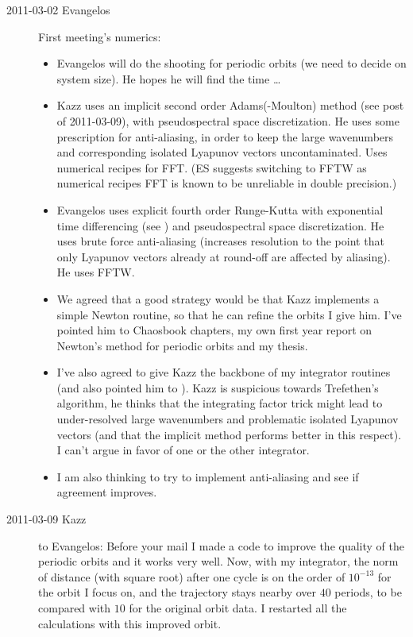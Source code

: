 \begin{description}
\item[2011-03-02 Evangelos] First meeting's numerics:
  \begin{itemize}
  \item Evangelos will do the shooting for periodic orbits
    (we need to decide on system size). He hopes he will find the time \ldots
  \item Kazz uses an implicit second order Adams(-Moulton) method (see post of
    2011-03-09), with pseudospectral space discretization.
    He uses some prescription for anti-aliasing, in order to keep the large wavenumbers
    and corresponding isolated Lyapunov vectors uncontaminated. Uses numerical
    recipes for FFT. (ES suggests switching to FFTW as numerical recipes FFT is
    known to be unreliable in double precision.)
  \item Evangelos uses explicit fourth order Runge-Kutta with exponential
    time differencing (see ) and pseudospectral space
    discretization. He uses brute force anti-aliasing (increases resolution
    to the point that only Lyapunov vectors already at round-off are affected by
    aliasing). He uses FFTW.
  \item We agreed that a good strategy would be that Kazz implements a simple
    Newton routine, so that he can refine the orbits I give him. I've
    pointed him to Chaosbook chapters, my own first year report on Newton's
    method for periodic orbits and my thesis.
  \item I've also agreed to give Kazz the backbone of my integrator routines
    (and also pointed him to ). Kazz is suspicious towards
    Trefethen's algorithm, he thinks that the integrating factor trick might
    lead to under-resolved large wavenumbers and problematic isolated
    Lyapunov vectors (and that the implicit method performs better in this
    respect). I can't argue in favor of one or the other integrator.
  \item I am also thinking to try to implement anti-aliasing and see
    if agreement improves.
  \end{itemize}

\item[2011-03-09 Kazz] to Evangelos:
  Before your mail I made a code to improve the quality of the periodic orbits
  and it works very well. Now, with my integrator, the norm of distance
  (with square root) after one cycle is on the order of $10^{-13}$ for the orbit
  I focus on, and the trajectory stays nearby over $40$ periods, to be compared
  with $10$ for the original orbit data. I restarted all the calculations
  with this improved orbit.


\end{description}

